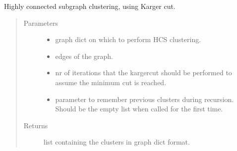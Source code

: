 \documentclass[letterpaper,10pt,english]{sphinxmanual}
\begin{document}
\begin{fulllineitems}
\label{\detokenize{clustering:clustering.HCS}}
\sphinxAtStartPar
Highly connected subgraph clustering, using Karger cut.
\begin{quote}\begin{description}
\item[{Parameters}] \leavevmode\begin{itemize}
\item {} 
\sphinxAtStartPar
{} \textendash{} graph dict on which to perform HCS clustering.

\item {} 
\sphinxAtStartPar
{} \textendash{} edges of the graph.

\item {} 
\sphinxAtStartPar
{} \textendash{} nr of iterations that the kargercut should be performed to assume the minimum cut is reached.

\item {} 
\sphinxAtStartPar
{} \textendash{} parameter to remember previous clusters during recursion. Should be the empty list when called for the first time.

\end{itemize}

\item[{Returns}] \leavevmode
\sphinxAtStartPar
list containing the clusters in graph dict format.

\end{description}\end{quote}

\end{fulllineitems}

\end{document}

